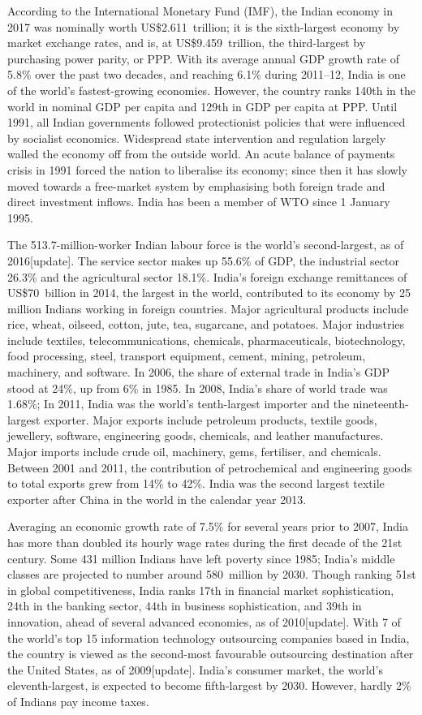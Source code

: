 According to the International Monetary Fund (IMF), the Indian economy
in 2017 was nominally worth US\$2.611~trillion; it is the sixth-largest
economy by market exchange rates, and is, at US\$9.459~trillion, the
third-largest by purchasing power parity, or PPP. With its average
annual GDP growth rate of 5.8\% over the past two decades, and reaching
6.1\% during 2011--12, India is one of the world's fastest-growing
economies. However, the country ranks 140th in the world in nominal GDP
per capita and 129th in GDP per capita at PPP. Until 1991, all Indian
governments followed protectionist policies that were influenced by
socialist economics. Widespread state intervention and regulation
largely walled the economy off from the outside world. An acute balance
of payments crisis in 1991 forced the nation to liberalise its economy;
since then it has slowly moved towards a free-market system by
emphasising both foreign trade and direct investment inflows. India has
been a member of WTO since 1 January 1995.

The 513.7-million-worker Indian labour force is the world's
second-largest, as of 2016{[}update{]}. The service sector makes up
55.6\% of GDP, the industrial sector 26.3\% and the agricultural sector
18.1\%. India's foreign exchange remittances of US\$70~billion in 2014,
the largest in the world, contributed to its economy by 25 million
Indians working in foreign countries. Major agricultural products
include rice, wheat, oilseed, cotton, jute, tea, sugarcane, and
potatoes. Major industries include textiles, telecommunications,
chemicals, pharmaceuticals, biotechnology, food processing, steel,
transport equipment, cement, mining, petroleum, machinery, and software.
In 2006, the share of external trade in India's GDP stood at 24\%, up
from 6\% in 1985. In 2008, India's share of world trade was 1.68\%; In
2011, India was the world's tenth-largest importer and the
nineteenth-largest exporter. Major exports include petroleum products,
textile goods, jewellery, software, engineering goods, chemicals, and
leather manufactures. Major imports include crude oil, machinery, gems,
fertiliser, and chemicals. Between 2001 and 2011, the contribution of
petrochemical and engineering goods to total exports grew from 14\% to
42\%. India was the second largest textile exporter after China in the
world in the calendar year 2013.

Averaging an economic growth rate of 7.5\% for several years prior to
2007, India has more than doubled its hourly wage rates during the first
decade of the 21st century. Some 431 million Indians have left poverty
since 1985; India's middle classes are projected to number around
580~million by 2030. Though ranking 51st in global competitiveness,
India ranks 17th in financial market sophistication, 24th in the banking
sector, 44th in business sophistication, and 39th in innovation, ahead
of several advanced economies, as of 2010{[}update{]}. With 7 of the
world's top 15 information technology outsourcing companies based in
India, the country is viewed as the second-most favourable outsourcing
destination after the United States, as of 2009{[}update{]}. India's
consumer market, the world's eleventh-largest, is expected to become
fifth-largest by 2030. However, hardly 2\% of Indians pay income taxes.

